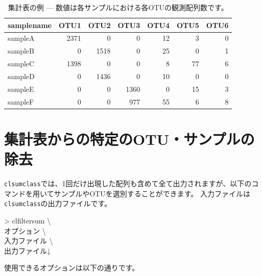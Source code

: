\documentclass[titlepage,10pt,a4paper]{jsbook}
\newenvironment{cmd}{\begin{oframed}\raggedright\ttfamily\footnotesize\setlength{\baselineskip}{1.4em}}{\end{oframed}\vspace{-1em}}
\begin{document}
\begin{table}[h]
\begin{center}
\footnotesize\setlength{\baselineskip}{0.9em}%
\begin{tabular}{l|rrrrrr} 
samplename & OTU1 & OTU2 & OTU3 & OTU4 & OTU5 & OTU6 \\\hline\hline
sampleA & 2371 & 0 & 0 & 12 & 3 & 0 \\
sampleB & 0 & 1518 & 0 & 25 & 0	& 1 \\
sampleC & 1398 & 0 & 0 & 8 & 77 & 6 \\
sampleD & 0 & 1436 & 0 & 10 & 0	& 0 \\
sampleE & 0 & 0 & 1360 & 0 & 15 & 3 \\
sampleF & 0 & 0 & 977 & 55 & 6 & 8 \\
\end{tabular}
\end{center}
\caption{集計表の例 --- 数値は各サンプルにおける各OTUの観測配列数です。}
\label{table:exampletableofsummary}
\end{table}

\section{集計表からの特定のOTU・サンプルの除去}\label{section:clfiltersum}

\texttt{clsumclass}では、1回だけ出現した配列も含めて全て出力されますが、以下のコマンドを用いてサンプルやOTUを選別することができます。
入力ファイルは\texttt{clsumclass}の出力ファイルです。

\begin{cmd}
{\textgreater} clfiltersum {\textbackslash}\\
オプション {\textbackslash}\\
入力ファイル {\textbackslash}\\
出力ファイル↓
\end{cmd}

使用できるオプションは以下の通りです。
\end{document}
